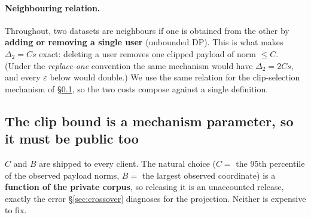 \documentclass[pdflatex,sn-mathphys-num,12pt]{sn-jnl}
\theoremstyle{thmstyleone}%
\theoremstyle{thmstyletwo}%
\theoremstyle{thmstylethree}%
\newcommand{\eps}{\varepsilon}
\newcommand{\secref}[1]{\S\ref{#1}}
\begin{document}
\paragraph{Neighbouring relation.} Throughout, two datasets are neighbours if one
is obtained from the other by \textbf{adding or removing a single user}
(unbounded DP). This is what makes $\Delta_2 = C s$ exact: deleting a user removes
one clipped payload of norm $\leq C$. (Under the \emph{replace-one} convention the
same mechanism would have $\Delta_2 = 2 C s$, and every $\eps$ below would double.)
We use the same relation for the clip-selection mechanism of \secref{sec:clip}, so
the two costs compose against a single definition.

\subsection{The clip bound is a mechanism parameter, so it must be public
too}\label{sec:clip}

$C$ and $B$ are shipped to every client. The natural choice ($C =$ the 95th
percentile of the observed payload norms, $B =$ the largest observed coordinate)
is a \textbf{function of the private corpus}, so releasing it is an unaccounted
release, exactly the error \secref{sec:crossover} diagnoses for the projection.
Neither is expensive to fix.
\end{document}
